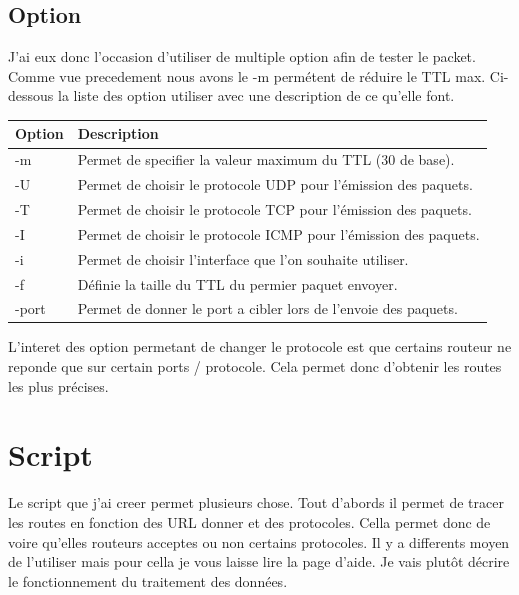 \documentclass[5pt]{article}
\begin{document}
      \subsection{Option}
       J'ai eux donc l'occasion d'utiliser de multiple option afin de tester le packet. Comme vue precedement nous avons le -m permétent de réduire le TTL max.  Ci-dessous la liste des option utiliser avec une description de ce qu'elle font.

       \begin{center}
        \begin{tabular}{|l|l|}
            \hline
            Option & Description \\
            \hline
             -m & Permet de specifier la valeur maximum du TTL (30 de base). \\
            \hline
            -U &  Permet de choisir le protocole UDP pour l'émission des paquets. \\
            \hline
            -T &  Permet de choisir le protocole TCP pour l'émission des paquets. \\
            \hline
            -I &  Permet de choisir le protocole ICMP  pour l'émission des paquets. \\
            \hline
            -i & Permet de choisir l'interface que l'on souhaite utiliser. \\
            \hline
            -f & Définie la taille du TTL du permier paquet envoyer. \\
            \hline
            -\-port & Permet de donner le port a cibler lors de l'envoie des paquets. \\
            \hline
        \end{tabular}
    \end{center}
    L'interet des option permetant de changer le protocole est que certains routeur ne reponde que sur certain ports / protocole. Cela permet donc d'obtenir les routes les plus précises.

    \section{Script}
    Le script que j'ai creer permet plusieurs chose. Tout d'abords il permet de tracer les routes en fonction des URL donner et des protocoles. Cella permet donc de voire qu'elles routeurs acceptes ou non certains protocoles. Il y a differents moyen de l'utiliser mais pour cella je vous laisse lire la page d'aide. Je vais plutôt décrire le fonctionnement du traitement des données. 
\end{document}
